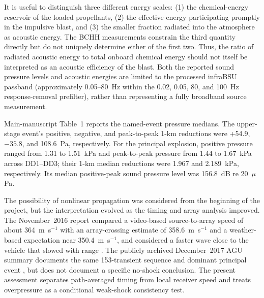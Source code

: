 \documentclass[]{seismica}
\begin{document}
It is useful to distinguish three different energy scales: (1) the
chemical-energy reservoir of the loaded propellants, (2) the effective energy
participating promptly in the impulsive blast, and (3) the smaller fraction
radiated into the atmosphere as acoustic energy. The BCHH measurements
constrain the third quantity directly but do not uniquely determine either of
the first two. Thus, the ratio of radiated acoustic energy to total onboard
chemical energy should not itself be interpreted as an acoustic efficiency of
the blast. Both the reported sound pressure levels and acoustic energies are
limited to the processed infraBSU passband (approximately 0.05--80~Hz within
the 0.02, 0.05, 80, and 100~Hz response-removal prefilter), rather than
representing a fully broadband source measurement.

Main-manuscript Table~1 reports the named-event pressure medians. The
upper-stage event's positive, negative, and peak-to-peak 1-km reductions were
+54.9, $-35.8$, and 108.6~Pa, respectively. For the principal explosion,
positive pressure ranged from 1.31 to 1.51~kPa and peak-to-peak pressure from
1.44 to 1.67~kPa across DD1--DD3; their 1-km median reductions were 1.967 and
2.189~kPa, respectively. Its median positive-peak sound pressure level was
156.8~dB re 20~$\mu$Pa.

The possibility of nonlinear propagation was considered from the beginning
of the project, but the interpretation evolved as the timing and array
analysis improved. The November~2016 report compared a video-based
source-to-array speed of about 364~m~s$^{-1}$ with an array-crossing estimate
of 358.6~m~s$^{-1}$ and a weather-based expectation near
350.4~m~s$^{-1}$, and considered a faster wave close to the vehicle that
slowed with range \citep{thompson_mcnutt_fireball_2016}. The publicly archived
December~2017 AGU summary documents the same 153-transient sequence and
dominant principal event \citep{thompson_agu_falcon9_2017}, but does not
document a specific no-shock conclusion. The present assessment separates
path-averaged timing from local receiver speed and treats overpressure as a
conditional weak-shock consistency test.
\end{document}
